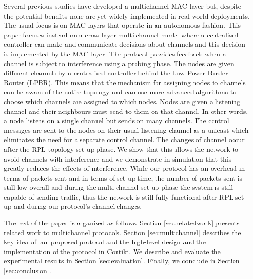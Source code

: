 Several previous studies have developed a multichannel MAC layer but, despite the potential benefits none are yet widely implemented in real world deployments. The usual focus
is on MAC layers that operate in an autonomous fashion.  This paper focuses instead on a cross-layer multi-channel model where a centralised controller can make and communicate decisions about channels and this decision is implemented by the MAC layer.  The protocol provides feedback when a channel is subject to interference using a probing phase. The nodes are given different channels by a centralised controller behind the Low Power Border Router (LPBR). This means that the mechanism for assigning nodes to channels can be aware of the entire topology and can use more advanced algorithms to choose which channels are assigned to which nodes. Nodes are given a listening channel and their neighbours must send to them on
that channel. In other words, a node listens on a single channel but sends on many channels.
The control messages are sent to the nodes on their usual listening channel as a unicast which eliminates the need for a separate control channel.
The changes of channel occur after the RPL topology set up phase. We show that this allows the network to avoid channels with interference and we
demonstrate in simulation that this greatly reduces the effects of interference. While our protocol has an overhead in terms of packets sent and in terms of set up time, the number of packets sent is still low overall and during the multi-channel set up phase the system is still capable of
sending traffic, thus the network is still fully functional after RPL set up and during our protocol's channel changes.

The rest of the paper is organised as follows: Section \ref{sec:relatedwork} presents related work to multichannel protocols. Section \ref{sec:multichannel} describes the key idea of our proposed protocol and the high-level design and the implementation of the protocol in Contiki. We describe and evaluate the experimental results in Section \ref{sec:evaluation}. Finally, we conclude in Section \ref{sec:conclusion}.

%
